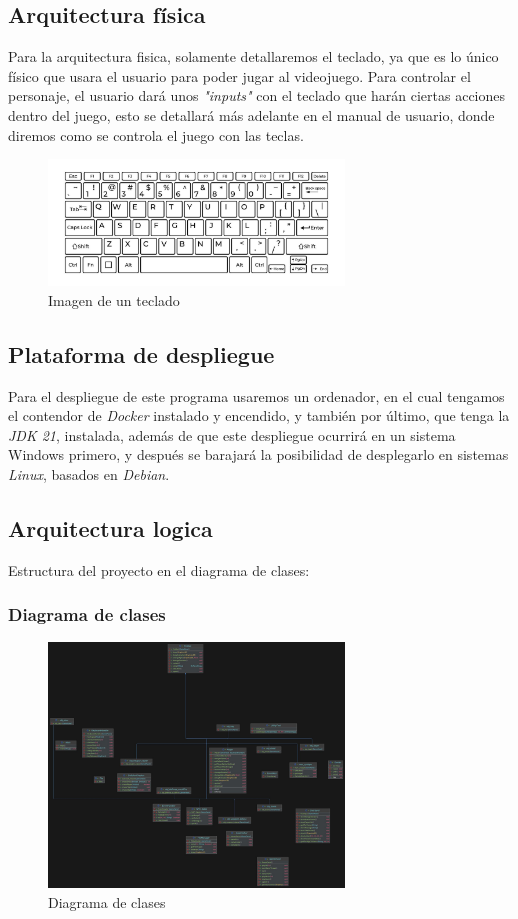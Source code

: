 \documentclass[a4paper]{article}
\begin{document}
\subsection{Arquitectura física}
Para la arquitectura fisica, solamente detallaremos el teclado, ya que es lo único físico que usara el usuario para poder jugar al videojuego.
Para controlar el personaje, el usuario dará unos \textit{"inputs"} con el teclado que harán ciertas acciones dentro del juego, esto se detallará más
adelante en el manual de usuario, donde diremos como se controla el juego con las teclas.
\begin{figure}[ht]
    \centering
    \includegraphics[width=0.7\textwidth]{Images/teclado.jpg}
    \caption{Imagen de un teclado}
    \label{fig:teclado}
\end{figure}
\subsection{Plataforma de despliegue}
Para el despliegue de este programa usaremos un ordenador, en el cual tengamos el contendor de \textit{Docker} instalado y encendido, y también por último, que tenga la \textit{JDK 21}, instalada, además de que este
despliegue ocurrirá en un sistema Windows primero, y después se barajará la posibilidad de desplegarlo en sistemas \textit{Linux}, basados en \textit{Debian}.
\clearpage
\subsection{Arquitectura logica}
Estructura del proyecto en el diagrama de clases:
\subsubsection{Diagrama de clases}
\begin{figure}[ht]
    \centering
    \includegraphics[width=0.7\textwidth]{Images/diagrama.jpg}
    \caption{Diagrama de clases}
    \label{fig:diagrama-clases}
\end{figure}
\end{document}
